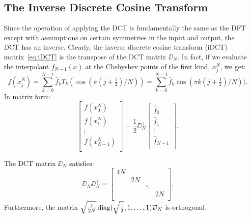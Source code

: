 \subsection{The Inverse Discrete Cosine Transform}

Since the operation of applying the DCT is fundamentally the same as the DFT except with assumptions on certain symmetries in the input and output, the DCT has an inverse. Clearly, the inverse discrete cosine transform (iDCT) matrix~\eqref{eq:iDCT} is the transpose of the DCT matrix $\DD_N$. In fact, if we evaluate the interpolant $f_{N-1}(x)$ at the Chebyshev points of the first kind, $x_j^N$, we get:
\begin{equation}
f(x_j^N) = \sum_{k=0}^{N-1} \hat{f}_k T_k(\cos(\pi(j+\tfrac{1}{2})/N)) = \sum_{k=0}^{N-1} \hat{f}_k \cos(\pi k(j+\tfrac{1}{2})/N)).
\end{equation}
In matrix form:
\begin{equation}\label{eq:iDCT}
\begin{bmatrix} f(x_0^N)\\ f(x_1^N)\\ \vdots\\ f(x_{N-1}^N)\\\end{bmatrix}
=
\frac{1}{2}\DD_N^\top
\begin{bmatrix} \hat{f}_0\\ \hat{f}_1\\ \vdots\\ \hat{f}_{N-1}\\\end{bmatrix}.
\end{equation}

\begin{theorem}
The DCT matrix $\DD_N$ satisfies:
\[
\DD_N\DD_N^\top = \begin{bmatrix} 4N\\ & 2N\\ &&\ddots\\&&&2N\\\end{bmatrix}.
\]
Furthermore, the matrix $\sqrt{\tfrac{1}{2N}}\operatorname{diag}(\sqrt{\tfrac{1}{2}},1,\ldots,1)\mathcal{D}_N$ is orthogonal.
\end{theorem}

